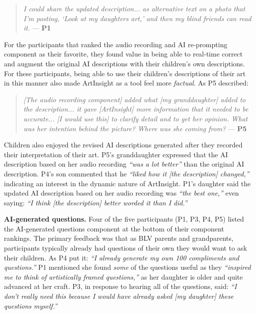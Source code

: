 \documentclass[sigconf]{acmart}
\begin{document}
\begin{quote}
    \textit{I could share the updated description... as alternative text on a photo that I'm posting, `Look at my daughters art,' and then my blind friends can read it.} --- \textbf{P1}
\end{quote}

For the participants that ranked the audio recording and AI re-prompting component as their favorite, they found value in being able to real-time correct and augment the original AI descriptions with their children's own descriptions. For these participants, being able to use their children's descriptions of their art in this manner also made ArtInsight as a tool feel more \textit{factual}. As P5 described: 

\begin{quote}
    \textit{[The audio recording component] added what [my granddaughter] added to the description... it gave [ArtInsight] more information that it needed to be accurate... [I would use this] to clarify detail and to get her opinion. What was her intention behind the picture? Where was she coming from?} --- \textbf{P5}
\end{quote}

Children also enjoyed the revised AI descriptions generated after they recorded their interpretation of their art. P5's granddaughter expressed that the AI description based on her audio recording \textit{``was a lot better''} than the original AI description. P4's son commented that he \textit{``liked how it [the description] changed,''} indicating an interest in the dynamic nature of ArtInsight. P1's daughter said the updated AI description based on her audio recording was \textit{``the best one,''} even saying: \textit{``I think [the description] better worded it than I did.''}

\textbf{AI-generated questions.} Four of the five participants (P1, P3, P4, P5) listed the AI-generated questions component at the bottom of their component rankings. The primary feedback was that as BLV parents and grandparents, participants typically already had questions of their own they would want to ask their children. As P4 put it: \textit{ ``I already generate my own 100 compliments and questions.''} P1 mentioned she found \textit{some} of the questions useful as they \textit{``inspired me to think of artistically framed questions,''} as her daughter is older and quite advanced at her craft. P3, in response to hearing all of the questions, said: \textit{``I don't really need this because I would have already asked [my daughter] these questions myself.''}
\end{document}
